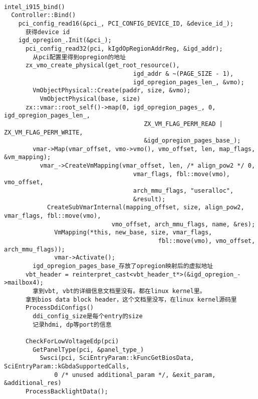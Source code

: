 \begin{verbatim}

intel_i915_bind()
  Controller::Bind()
    pci_config_read16(&pci_, PCI_CONFIG_DEVICE_ID, &device_id_);
      获得device id
    igd_opregion_.Init(&pci_);
      pci_config_read32(pci, kIgdOpRegionAddrReg, &igd_addr);
        从pci配置里得到opregion的地址
      zx_vmo_create_physical(get_root_resource(),
                                    igd_addr & ~(PAGE_SIZE - 1),
                                    igd_opregion_pages_len_, &vmo);
        VmObjectPhysical::Create(paddr, size, &vmo);
          VmObjectPhysical(base, size)
      zx::vmar::root_self()->map(0, igd_opregion_pages_, 0, igd_opregion_pages_len_,
                                       ZX_VM_FLAG_PERM_READ | ZX_VM_FLAG_PERM_WRITE,
                                       &igd_opregion_pages_base_);
        vmar->Map(vmar_offset, vmo->vmo(), vmo_offset, len, map_flags, &vm_mapping);                               
          vmar_->CreateVmMapping(vmar_offset, len, /* align_pow2 */ 0,
                                    vmar_flags, fbl::move(vmo), vmo_offset,
                                    arch_mmu_flags, "useralloc",
                                    &result);
            CreateSubVmarInternal(mapping_offset, size, align_pow2, vmar_flags, fbl::move(vmo),
                              vmo_offset, arch_mmu_flags, name, &res);
              VmMapping(*this, new_base, size, vmar_flags,
                                           fbl::move(vmo), vmo_offset, arch_mmu_flags));
              vmar->Activate();
        igd_opregion_pages_base_存放了opregion映射后的虚拟地址      
      vbt_header = reinterpret_cast<vbt_header_t*>(&igd_opregion_->mailbox4);
        拿到vbt, vbt的详细信息文档里没有。都在linux kernel里。                                                            
      拿到bios data block header，这个文档里没写，在linux kernel源码里
      ProcessDdiConfigs()
        ddi_config_size是每个entry的size
        记录hdmi, dp等port的信息

      CheckForLowVoltageEdp(pci)
        GetPanelType(pci, &panel_type_)
          Swsci(pci, SciEntryParam::kFuncGetBiosData, SciEntryParam::kGbdaSupportedCalls,
              0 /* unused additional_param */, &exit_param, &additional_res)
      ProcessBacklightData();


\end{verbatim}
